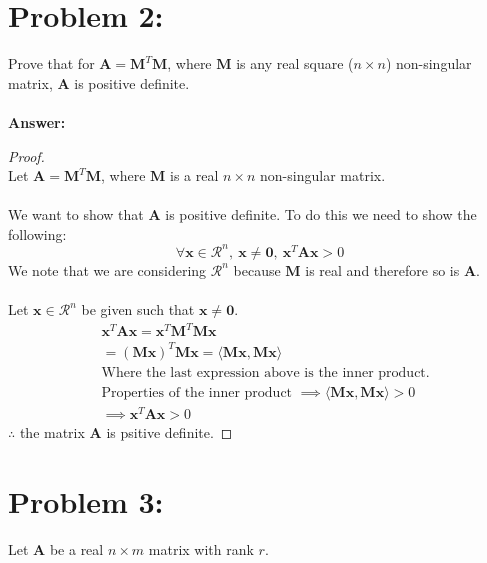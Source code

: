 \documentclass[]{article}
\begin{document}
\section*{Problem 2:}
Prove that for $\mathbf{A}=\mathbf{M}^T\mathbf{M}$, where $\mathbf{M}$ is any real square ($n\times n$) non-singular matrix, $\mathbf{A}$ is positive definite.
\\~\\
\textbf{Answer:}
\begin{proof}~\\
	Let $\mathbf{A}=\mathbf{M}^T\mathbf{M}$, where $\mathbf{M}$ is a real $n\times n$ non-singular matrix.\\~\\
	We want to show that $\mathbf{A}$ is positive definite. To do this we need to show the following:
	\[\forall\mathbf{x}\in\mathcal{R}^n,\:\mathbf{x}\neq\mathbf{0},\:\mathbf{x}^T\mathbf{Ax}>0\]
	We note that we are considering $\mathcal{R}^n$ because $\mathbf{M}$ is real and therefore so is $\mathbf{A}$.\\~\\
	Let $\mathbf{x}\in\mathcal{R}^n$ be given such that $\mathbf{x}\neq\mathbf{0}$.
	\begin{align*}
		&\mathbf{x}^T\mathbf{Ax} = \mathbf{x}^T\mathbf{M}^T\mathbf{Mx}\\
		&=(\mathbf{Mx})^T\mathbf{Mx} = \langle\mathbf{Mx},\mathbf{Mx}\rangle\\
		&\text{Where the last expression above is the inner product.}\\
		&\text{Properties of the inner product }\implies \langle\mathbf{Mx},\mathbf{Mx}\rangle > 0\\
		&\implies \mathbf{x}^T\mathbf{Ax}>0
	\end{align*}
	$\therefore$ the matrix $\mathbf{A}$ is psitive definite. 
\end{proof}

\newpage
\section*{Problem 3:}
Let $\mathbf{A}$ be a real $n\times m$ matrix with rank $r$.
\end{document}
